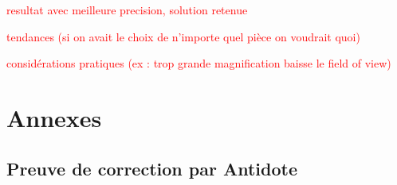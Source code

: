 \documentclass[conference]{IEEEtran}
\begin{document}
\textcolor{red}{resultat avec meilleure precision, solution retenue}

\textcolor{red}{tendances (si on avait le choix de n'importe quel pièce on voudrait quoi)}

\textcolor{red}{considérations pratiques (ex : trop grande magnification baisse le field of view)}


\clearpage

\section{Annexes}

\subsection{Preuve de correction par Antidote}

\clearpage
\end{document}
